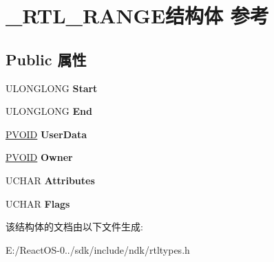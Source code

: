 \hypertarget{struct___r_t_l___r_a_n_g_e}{}\section{\+\_\+\+R\+T\+L\+\_\+\+R\+A\+N\+G\+E结构体 参考}
\label{struct___r_t_l___r_a_n_g_e}
\subsection*{Public 属性}
\begin{DoxyCompactItemize}
\item 
\mbox{\label{struct___r_t_l___r_a_n_g_e_a28c276eef89465571a9c30410b825200}} 
U\+L\+O\+N\+G\+L\+O\+NG {\bfseries Start}
\item 
\mbox{\label{struct___r_t_l___r_a_n_g_e_a1d12fa26e62a9eccca731ed620a1a774}} 
U\+L\+O\+N\+G\+L\+O\+NG {\bfseries End}
\item 
\mbox{\label{struct___r_t_l___r_a_n_g_e_a2f31fe78073edfc879ebbb872baf618b}} 
\hyperlink{interfacevoid}{P\+V\+O\+ID} {\bfseries User\+Data}
\item 
\mbox{\label{struct___r_t_l___r_a_n_g_e_a50b66c7647e22d3f7bda5da64274b6e8}} 
\hyperlink{interfacevoid}{P\+V\+O\+ID} {\bfseries Owner}
\item 
\mbox{\label{struct___r_t_l___r_a_n_g_e_a2dd9d4d4daab967594b82ce62f2caa7d}} 
U\+C\+H\+AR {\bfseries Attributes}
\item 
\mbox{\label{struct___r_t_l___r_a_n_g_e_a605b803de73c0d0ba1307ff833eb1171}} 
U\+C\+H\+AR {\bfseries Flags}
\end{DoxyCompactItemize}


该结构体的文档由以下文件生成\+:\begin{DoxyCompactItemize}
\item 
E\+:/\+React\+O\+S-\/0../sdk/include/ndk/rtltypes.\+h\end{DoxyCompactItemize}

